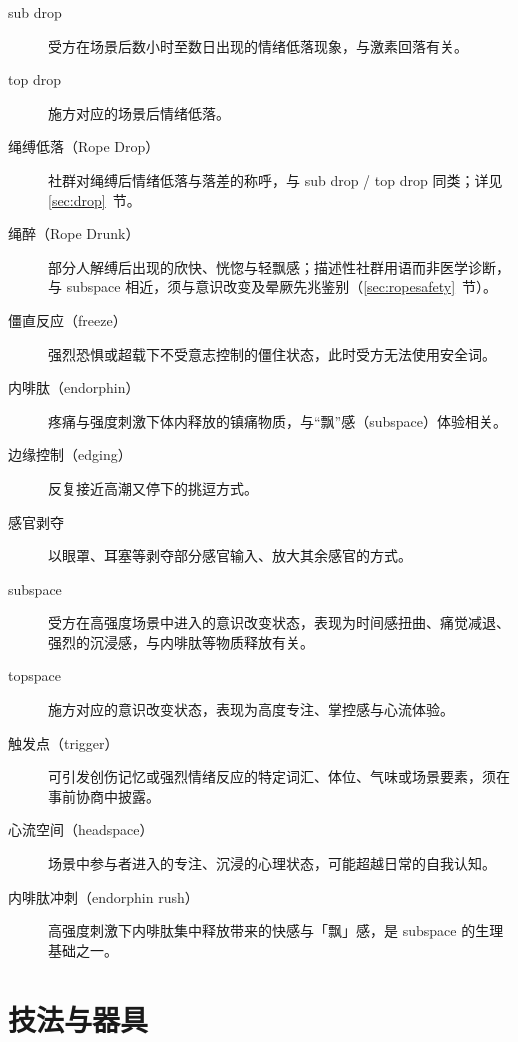 \documentclass[12pt,UTF8]{ctexbook}
\begin{document}
\begin{description}
\item[sub drop] 受方在场景后数小时至数日出现的情绪低落现象，与激素回落有关。
\item[top drop] 施方对应的场景后情绪低落。
\item[绳缚低落（Rope Drop）] 社群对绳缚后情绪低落与落差的称呼，与 sub drop / top drop 同类；详见\ref{sec:drop}~节。
\item[绳醉（Rope Drunk）] 部分人解缚后出现的欣快、恍惚与轻飘感；描述性社群用语而非医学诊断，与 subspace 相近，须与意识改变及晕厥先兆鉴别（\ref{sec:ropesafety}~节）。
\item[僵直反应（freeze）] 强烈恐惧或超载下不受意志控制的僵住状态，此时受方无法使用安全词。
\item[内啡肽（endorphin）] 疼痛与强度刺激下体内释放的镇痛物质，与“飘”感（subspace）体验相关。
\item[边缘控制（edging）] 反复接近高潮又停下的挑逗方式。
\item[感官剥夺] 以眼罩、耳塞等剥夺部分感官输入、放大其余感官的方式。
\item[subspace] 受方在高强度场景中进入的意识改变状态，表现为时间感扭曲、痛觉减退、强烈的沉浸感，与内啡肽等物质释放有关。
\item[topspace] 施方对应的意识改变状态，表现为高度专注、掌控感与心流体验。
\item[触发点（trigger）] 可引发创伤记忆或强烈情绪反应的特定词汇、体位、气味或场景要素，须在事前协商中披露。
\item[心流空间（headspace）] 场景中参与者进入的专注、沉浸的心理状态，可能超越日常的自我认知。
\item[内啡肽冲刺（endorphin rush）] 高强度刺激下内啡肽集中释放带来的快感与「飘」感，是 subspace 的生理基础之一。
\end{description}

\section{技法与器具}
\end{document}
